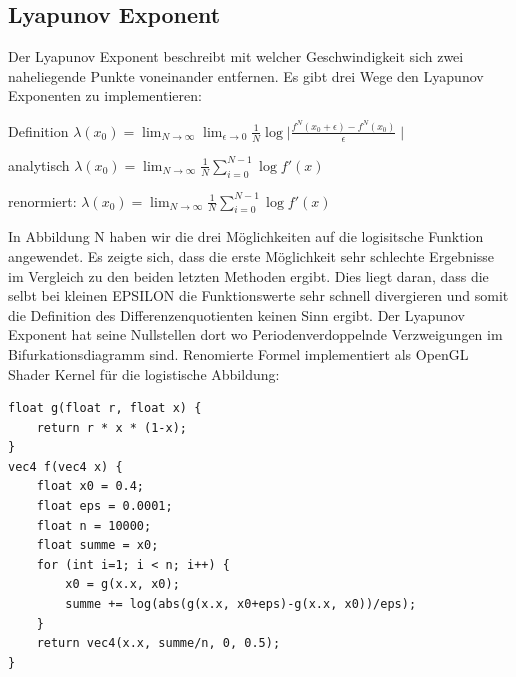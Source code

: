 \documentclass{scrartcl}
\begin{document}
\subsection{Lyapunov Exponent}
Der Lyapunov Exponent beschreibt mit welcher Geschwindigkeit sich zwei naheliegende Punkte voneinander entfernen. 
Es gibt drei Wege den Lyapunov Exponenten zu implementieren:

Definition
$\lambda(x_0) = \lim_{N \rightarrow \infty}\lim_{\epsilon \rightarrow 0} \frac{1}{N}\log{\mid \frac{f^N(x_0+\epsilon)- f^N(x_0)}{\epsilon} \mid} $


analytisch
$\lambda(x_0) = \lim_{N \rightarrow \infty} \frac{1}{N} \sum_{i=0}^{N-1}  \log{f'(x)} $


renormiert:
$\lambda(x_0) = \lim_{N \rightarrow \infty} \frac{1}{N} \sum_{i=0}^{N-1}  \log{f'(x)} $


In Abbildung N haben wir die drei Möglichkeiten auf die logisitsche Funktion angewendet. Es zeigte sich, dass die erste Möglichkeit sehr schlechte Ergebnisse im Vergleich zu den beiden letzten Methoden ergibt. Dies liegt daran, dass die selbt bei kleinen EPSILON die Funktionswerte sehr schnell divergieren und somit die Definition des Differenzenquotienten keinen Sinn ergibt. 
Der Lyapunov Exponent hat seine Nullstellen dort wo Periodenverdoppelnde Verzweigungen im Bifurkationsdiagramm sind. 
Renomierte Formel implementiert als OpenGL Shader Kernel für die logistische Abbildung:
\begin{lstlisting}
float g(float r, float x) {
    return r * x * (1-x);
}
vec4 f(vec4 x) {
    float x0 = 0.4;
    float eps = 0.0001;
    float n = 10000;
    float summe = x0;
    for (int i=1; i < n; i++) {
        x0 = g(x.x, x0);
        summe += log(abs(g(x.x, x0+eps)-g(x.x, x0))/eps);
    }
    return vec4(x.x, summe/n, 0, 0.5);
}
\end{lstlisting}
 
\end{document}
